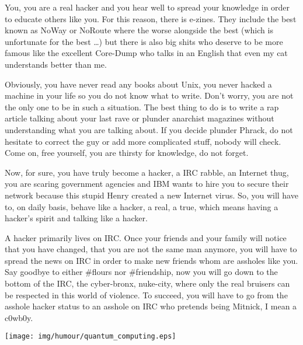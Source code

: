 You, you are a real hacker and you hear well to spread your knowledge in order to educate others like you. For this reason, there is e-zines. They include the best known as NoWay or NoRoute where the worse alongside the best (which is unfortunate for the best …) but there is also big shits who deserve to be more famous like the excellent Core-Dump who talks in an English that even my cat understands better than me.

Obviously, you have never read any books about Unix, you never hacked a machine in your life so you do not know what to write. Don't worry, you are not the only one to be in such a situation. The best thing to do is to write a rap article talking about your last rave or plunder anarchist magazines without understanding what you are talking about. If you decide plunder Phrack, do not hesitate to correct the guy or add more complicated stuff, nobody will check. Come on, free yourself, you are thirsty for knowledge, do not forget.

Now, for sure, you have truly become a hacker, a IRC rabble, an Internet thug, you are scaring government agencies and IBM wants to hire you to secure their network because this stupid Henry created a new Internet virus. So, you will have to, on daily basis, behave like a hacker, a real, a true, which means having a hacker's spirit and talking like a hacker.

A hacker primarily lives on IRC. Once your friends and your family will notice that you have changed, that you are not the same man anymore, you will have to spread the news on IRC in order to make new friends whom are assholes like you. Say goodbye to either \#flours nor \#friendship, now you will go down to the bottom of the IRC, the cyber-bronx, nuke-city, where only the real bruisers can be respected in this world of violence. To succeed, you will have to go from the asshole hacker status to an asshole on IRC who pretends being Mitnick, I mean a c0wb0y.
\begin{center}\underline{\hspace{5 cm}}\end{center}	

	\begin{center}
	\texttt{[image: img/humour/quantum\_computing.eps]}
	\end{center}
\begin{center}\underline{\hspace{5 cm}}\end{center}

